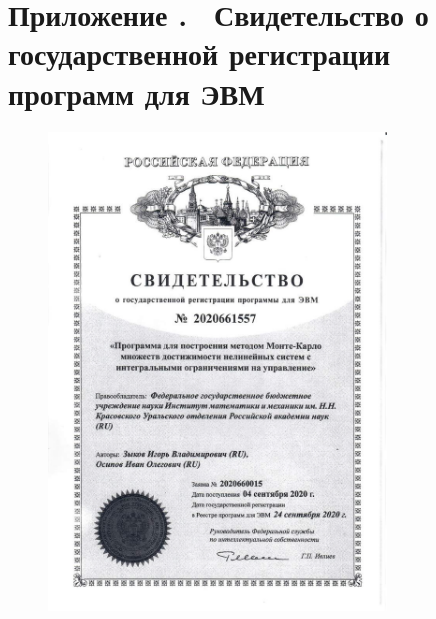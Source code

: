 \documentclass[../main.tex]{subfiles}
\begin{document}
\clearpage
{}
\section*{Приложение .  Свидетельство о государственной регистрации программ для ЭВМ}%
\label{app:B}%
\renewcommand{\theequation}{\Alph{section}.\arabic{equation}}%
\setcounter{equation}{0}
 	\begin{figure}[h]
 		\centering
 			\includegraphics[width=0.8\textwidth]{images/ZykovOsipovPatent.jpg}
 	\end{figure}
\end{document}
